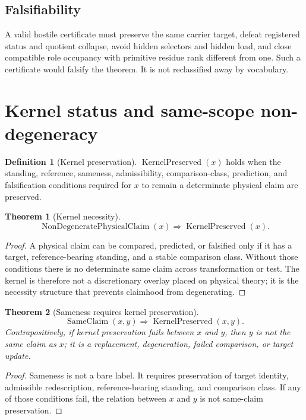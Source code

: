 \documentclass[11pt]{article}
\newcommand{\KernelPreserved}{\operatorname{KernelPreserved}}
\newcommand{\NonDegeneratePhysicalClaim}{\operatorname{NonDegeneratePhysicalClaim}}
\newcommand{\SameClaim}{\operatorname{SameClaim}}
\theoremstyle{definition}
\newtheorem{definition}{Definition}[section]
\theoremstyle{plain}
\newtheorem{theorem}{Theorem}[section]
\theoremstyle{remark}
\begin{document}
\subsection{Falsifiability}
A valid hostile certificate must preserve the same carrier target, defeat registered status and quotient collapse, avoid hidden selectors and hidden load, and close compatible role occupancy with primitive residue rank different from one. Such a certificate would falsify the theorem. It is not reclassified away by vocabulary.

\section{Kernel status and same-scope non-degeneracy}

\begin{definition}[Kernel preservation]
\(\KernelPreserved(x)\) holds when the standing, reference, sameness, admissibility, comparison-class, prediction, and falsification conditions required for \(x\) to remain a determinate physical claim are preserved.
\end{definition}

\begin{theorem}[Kernel necessity]
\[
\NonDegeneratePhysicalClaim(x)\Rightarrow \KernelPreserved(x).
\]
\end{theorem}
\begin{proof}
A physical claim can be compared, predicted, or falsified only if it has a target, reference-bearing standing, and a stable comparison class. Without those conditions there is no determinate same claim across transformation or test. The kernel is therefore not a discretionary overlay placed on physical theory; it is the necessity structure that prevents claimhood from degenerating.
\end{proof}

\begin{theorem}[Sameness requires kernel preservation]
\[
\SameClaim(x,y)\Rightarrow \KernelPreserved(x,y).
\]
Contrapositively, if kernel preservation fails between \(x\) and \(y\), then \(y\) is not the same claim as \(x\); it is a replacement, degeneration, failed comparison, or target update.
\end{theorem}
\begin{proof}
Sameness is not a bare label. It requires preservation of target identity, admissible redescription, reference-bearing standing, and comparison class. If any of those conditions fail, the relation between \(x\) and \(y\) is not same-claim preservation.
\end{proof}
\end{document}
